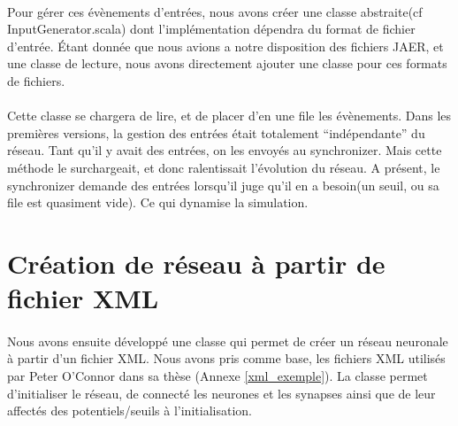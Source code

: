\documentclass[a4paper,10pt]{article}
\begin{document}
\paragraph{}
Pour gérer ces évènements d’entrées, nous avons créer une classe abstraite(cf InputGenerator.scala) dont l’implémentation dépendra du format de fichier d’entrée. Étant donnée que nous avions a notre disposition des fichiers JAER, et une classe de lecture, nous avons directement ajouter une classe pour ces formats de fichiers.

\paragraph{}
Cette classe se chargera de lire, et de placer d’en une file les évènements. Dans les premières versions, la gestion des entrées était totalement “indépendante” du réseau. Tant qu’il y avait des entrées, on les envoyés au synchronizer. Mais cette méthode le surchargeait, et donc ralentissait l’évolution du réseau. A présent, le synchronizer demande des entrées lorsqu’il juge qu’il en a besoin(un seuil, ou sa file est quasiment vide). Ce qui dynamise la simulation.

\newpage

\section{Création de réseau à partir de fichier XML}

\paragraph{}
Nous avons ensuite développé une classe qui permet de créer un réseau neuronale à partir d’un fichier XML.
Nous avons pris comme base, les fichiers XML utilisés par Peter O’Connor dans sa thèse (Annexe \ref{xml_exemple}). La classe permet d’initialiser le réseau, de connecté les neurones et les synapses ainsi que de leur affectés des potentiels/seuils à l’initialisation.
\end{document}
